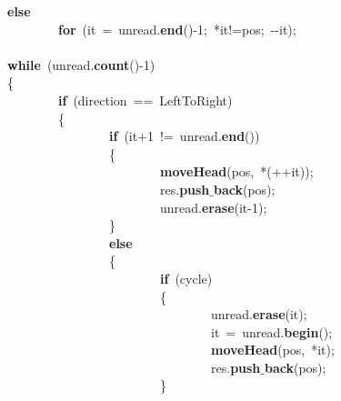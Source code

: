 \mbox{}\ \ \ \ \ \ \ \ \textbf{else} \\
\mbox{}\ \ \ \ \ \ \ \ \ \ \ \ \ \ \ \ \textbf{for}\ (it\ =\ unread.\textbf{end}()-1;\ *it!=pos;\ -\/-it); \\
\mbox{} \\
\mbox{}\ \ \ \ \ \ \ \ \textbf{while}\ (unread.\textbf{count}()-1) \\
\mbox{}\ \ \ \ \ \ \ \ \{ \\
\mbox{}\ \ \ \ \ \ \ \ \ \ \ \ \ \ \ \ \textbf{if}\ (direction\ ==\ LeftToRight) \\
\mbox{}\ \ \ \ \ \ \ \ \ \ \ \ \ \ \ \ \{ \\
\mbox{}\ \ \ \ \ \ \ \ \ \ \ \ \ \ \ \ \ \ \ \ \ \ \ \ \textbf{if}\ (it+1\ !=\ unread.\textbf{end}()) \\
\mbox{}\ \ \ \ \ \ \ \ \ \ \ \ \ \ \ \ \ \ \ \ \ \ \ \ \{ \\
\mbox{}\ \ \ \ \ \ \ \ \ \ \ \ \ \ \ \ \ \ \ \ \ \ \ \ \ \ \ \ \ \ \ \ \textbf{moveHead}(pos,\ *(++it)); \\
\mbox{}\ \ \ \ \ \ \ \ \ \ \ \ \ \ \ \ \ \ \ \ \ \ \ \ \ \ \ \ \ \ \ \ res.\textbf{push$\_$back}(pos); \\
\mbox{}\ \ \ \ \ \ \ \ \ \ \ \ \ \ \ \ \ \ \ \ \ \ \ \ \ \ \ \ \ \ \ \ unread.\textbf{erase}(it-1); \\
\mbox{}\ \ \ \ \ \ \ \ \ \ \ \ \ \ \ \ \ \ \ \ \ \ \ \ \} \\
\mbox{}\ \ \ \ \ \ \ \ \ \ \ \ \ \ \ \ \ \ \ \ \ \ \ \ \textbf{else} \\
\mbox{}\ \ \ \ \ \ \ \ \ \ \ \ \ \ \ \ \ \ \ \ \ \ \ \ \{ \\
\mbox{}\ \ \ \ \ \ \ \ \ \ \ \ \ \ \ \ \ \ \ \ \ \ \ \ \ \ \ \ \ \ \ \ \textbf{if}\ (cycle) \\
\mbox{}\ \ \ \ \ \ \ \ \ \ \ \ \ \ \ \ \ \ \ \ \ \ \ \ \ \ \ \ \ \ \ \ \{ \\
\mbox{}\ \ \ \ \ \ \ \ \ \ \ \ \ \ \ \ \ \ \ \ \ \ \ \ \ \ \ \ \ \ \ \ \ \ \ \ \ \ \ \ unread.\textbf{erase}(it); \\
\mbox{}\ \ \ \ \ \ \ \ \ \ \ \ \ \ \ \ \ \ \ \ \ \ \ \ \ \ \ \ \ \ \ \ \ \ \ \ \ \ \ \ it\ =\ unread.\textbf{begin}(); \\
\mbox{}\ \ \ \ \ \ \ \ \ \ \ \ \ \ \ \ \ \ \ \ \ \ \ \ \ \ \ \ \ \ \ \ \ \ \ \ \ \ \ \ \textbf{moveHead}(pos,\ *it); \\
\mbox{}\ \ \ \ \ \ \ \ \ \ \ \ \ \ \ \ \ \ \ \ \ \ \ \ \ \ \ \ \ \ \ \ \ \ \ \ \ \ \ \ res.\textbf{push$\_$back}(pos); \\
\mbox{}\ \ \ \ \ \ \ \ \ \ \ \ \ \ \ \ \ \ \ \ \ \ \ \ \ \ \ \ \ \ \ \ \} \\
